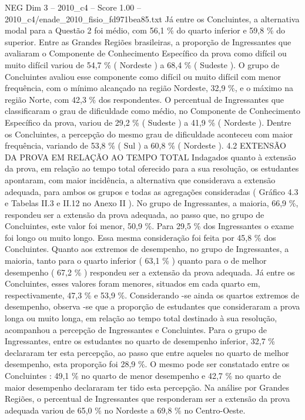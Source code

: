 \begin{textsample}{NEG Dim 3 – 2010\_c4 – Score 1.00 – 2010\_c4/enade\_2010\_fisio\_fd971bea85.txt}
Já entre os Concluintes, a alternativa modal para a Questão 2 foi médio, com 56,1 \% do quarto inferior e 59,8 \% do superior.
Entre as Grandes Regiões brasileiras, a proporção de Ingressantes que avaliaram o Componente de Conhecimento Específico da prova como difícil ou muito difícil variou de 54,7 \% ( Nordeste ) a 68,4 \% ( Sudeste ).
O grupo de Concluintes avaliou esse componente como difícil ou muito difícil com menor frequência, com o mínimo alcançado na região Nordeste, 32,9 \%, e o máximo na região Norte, com 42,3 \% dos respondentes.
O percentual de Ingressantes que classificaram o grau de dificuldade como médio, no Componente de Conhecimento Específico da prova, variou de 29,2 \% ( Sudeste ) a 41,9 \% ( Nordeste ).
Dentre os Concluintes, a percepção do mesmo grau de dificuldade aconteceu com maior frequência, variando de 53,8 \% ( Sul ) a 60,8 \% ( Nordeste ). 4.2 EXTENSÃO DA PROVA EM RELAÇÃO AO TEMPO TOTAL Indagados quanto à extensão da prova, em relação ao tempo total oferecido para a sua resolução, os estudantes apontaram, com maior incidência, a alternativa que considerava a extensão adequada, para ambos os grupos e todas as agregações consideradas ( Gráfico 4.3 e Tabelas II.3 e II.12 no Anexo II ).
No grupo de Ingressantes, a maioria, 66,9 \%, respondeu ser a extensão da prova adequada, ao passo que, no grupo de Concluintes, este valor foi menor, 50,9 \%.
Para 29,5 \% dos Ingressantes o exame foi longo ou muito longo.
Essa mesma consideração foi feita por 45,8 \% dos Concluintes.
Quanto aos extremos de desempenho, no grupo de Ingressantes, a maioria, tanto para o quarto inferior ( 63,1 \% ) quanto para o de melhor desempenho ( 67,2 \% ) respondeu ser a extensão da prova adequada.
Já entre os Concluintes, esses valores foram menores, situados em cada quarto em, respectivamente, 47,3 \% e 53,9 \%.
Considerando -se ainda os quartos extremos de desempenho, observa -se que a proporção de estudantes que consideraram a prova longa ou muito longa, em relação ao tempo total destinado à sua resolução, acompanhou a percepção de Ingressantes e Concluintes.
Para o grupo de Ingressantes, entre os estudantes no quarto de desempenho inferior, 32,7 \% declararam ter esta percepção, ao passo que entre aqueles no quarto de melhor desempenho, esta proporção foi 28,9 \%.
O mesmo pode ser constatado entre os Concluintes : 49,1 \% no quarto de menor desempenho e 42,7 \% no quarto de maior desempenho declararam ter tido esta percepção.
Na análise por Grandes Regiões, o percentual de Ingressantes que responderam ser a extensão da prova adequada variou de 65,0 \% no Nordeste a 69,8 \% no Centro-Oeste.

\end{textsample}
